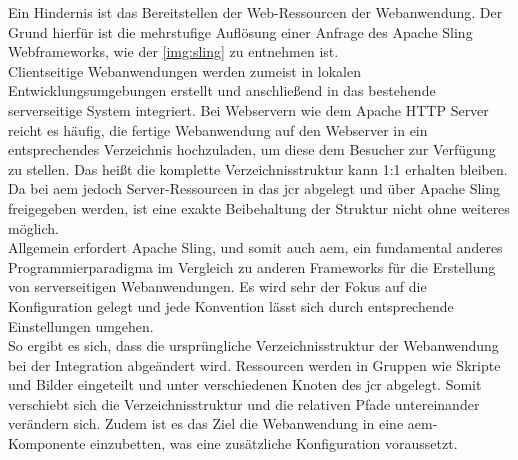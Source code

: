 Ein Hindernis ist das Bereitstellen der Web-Ressourcen der Webanwendung. Der Grund hierfür ist die mehrstufige Auflösung einer Anfrage des Apache Sling Webframeworks, wie der \autoref{img:sling} zu entnehmen ist.\\
Clientseitige Webanwendungen werden zumeist in lokalen Entwicklungsumgebungen erstellt und anschließend in das bestehende serverseitige System integriert. Bei Webservern wie dem Apache HTTP Server reicht es häufig, die fertige Webanwendung auf den Webserver in ein entsprechendes Verzeichnis hochzuladen, um diese dem Besucher zur Verfügung zu stellen. Das heißt die komplette Verzeichnisstruktur kann 1:1 erhalten bleiben. \\
Da bei \ac{aem} jedoch Server-Ressourcen in das \ac{jcr} abgelegt und über Apache Sling freigegeben werden, ist eine exakte Beibehaltung der Struktur nicht ohne weiteres möglich. \\
Allgemein erfordert Apache Sling, und somit auch \ac{aem}, ein fundamental anderes Programmierparadigma im Vergleich zu anderen Frameworks für die Erstellung von serverseitigen Webanwendungen. Es wird sehr der Fokus auf die Konfiguration gelegt und jede Konvention lässt sich durch entsprechende Einstellungen umgehen.\\
So ergibt es sich, dass die ursprüngliche Verzeichnisstruktur der Webanwendung bei der Integration abgeändert wird. Ressourcen werden in Gruppen wie Skripte und Bilder eingeteilt und unter verschiedenen Knoten des \ac{jcr} abgelegt. Somit verschiebt sich die Verzeichnisstruktur und die relativen Pfade untereinander verändern sich. Zudem ist es das Ziel die Webanwendung in eine \ac{aem}-Komponente einzubetten, was eine zusätzliche Konfiguration voraussetzt. 